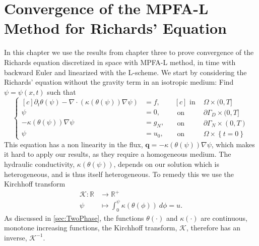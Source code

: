 \documentclass[../Main/main.tex]{subfiles}
\begin{document}
	\graphicspath{{../Time dependent equations/figs/}}
	\chapter{Convergence of the MPFA-L Method for Richards' Equation}
	\label{chap:convergence richards}
	In this chapter we use the results from chapter three to prove convergence of the Richards equation discretized in space with MPFA-L method, in time with backward Euler and linearized with the L-scheme.
	We start by considering the Richards' equation without the gravity term in an isotropic medium: Find $\psi = \psi(x,t)$ such that
	\begin{equation}\label{eq:richards w bc}
		\left \{
		\begin{aligned}[c]
			\partial_t \theta(\psi) - \nabla \cdot \left (\kappa(\theta (\psi)) \nabla \psi \right ) &= f, \\
			\psi &= 0, \\
			-\kappa(\theta (\psi)) \nabla \psi &= g_N,\\
			\psi &= u_0,
		\end{aligned}
		\ \ \
		\begin{aligned}[c]
			\text{ in }& \Omega \times (0,T]\\
			\text{ on }& \partial \Gamma_D \times (0,T]\\
			\text{ on }& \partial \Gamma_N \times (0,T)\\
			\text{ on }& \Omega \times \left\{t=0\right \}
		\end{aligned}
		\right.
	\end{equation}
	This equation has a non linearity in the flux, $\bm{q}=-\kappa(\theta (\psi)) \nabla \psi$, which makes it hard to apply our results, as they require a homogeneous medium. The hydraulic conductivity, $\kappa(\theta (\psi))$, depends on our solution which is heterogeneous, and is thus itself heterogeneous.
	To remedy this we use the Kirchhoff transform 
	\begin{equation}
		\begin{aligned}
			\mathcal{K} :\mathbb{R} &\rightarrow \mathbb{R}^{+}\\
			\psi &\mapsto \int_{0}^{\psi} \kappa(\theta(\phi)) \ d \phi = u.
		\end{aligned}
	\end{equation}
	As discussed in \ref{sec:TwoPhase}, the functions $\theta(\cdot)$ and $\kappa(\cdot)$ are continuous, monotone increasing functions, the Kirchhoff transform, $\mathcal{K}$, therefore has an inverse, $\mathcal{K}^{-1}$. 
\end{document}
